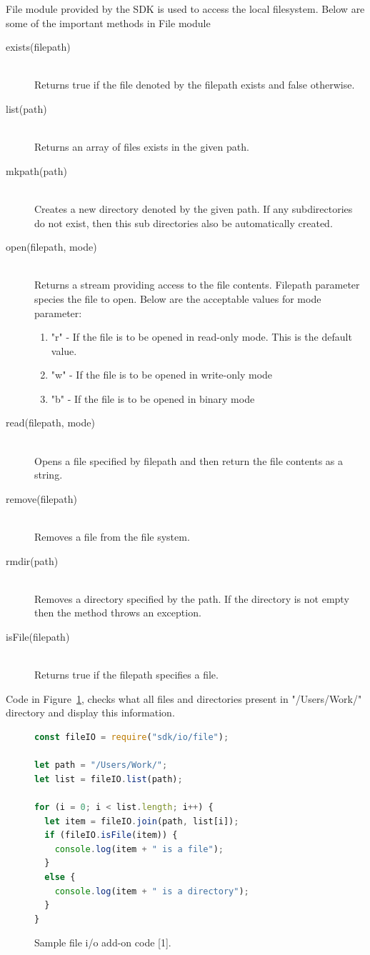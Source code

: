 File module provided by the SDK is used to access the local filesystem. Below are some of the important methods in File module
\begin{description}
\item[exists(filepath)]\hfill \\
Returns true if the file denoted by the filepath exists and false otherwise.
\item[list(path)]\hfill \\
Returns an array of files exists in the given path.
\item[mkpath(path)]\hfill \\
Creates a new directory denoted by the given path. If any subdirectories do not exist, then this sub directories also be automatically created.
\item[open(filepath, mode)]\hfill \\
Returns a stream providing access to the file contents. Filepath parameter species the file to open. Below are the acceptable values for mode parameter:
\begin{enumerate} 
\item "r" - If the file is to be opened in read-only mode. This is the default value. 
\item "w" - If the file is to be opened in write-only mode 
\item "b" - If the file is to be opened in binary mode 
\end{enumerate}
\item[read(filepath, mode)]\hfill \\
Opens a file specified by filepath and then return the file contents as a string.
\item[remove(filepath)]\hfill \\
Removes a file from the file system. 
\item[rmdir(path)]\hfill \\
Removes a directory specified by the path. If the directory is not empty then the method throws an exception.
\item[isFile(filepath)]\hfill \\
Returns true if the filepath specifies a file.
\end{description}


Code in Figure~\ref{fig:fileioaddon}, checks what all files and directories present in "/Users/Work/" directory and display this information.
\begin{figure}[h]
  \centering
\begin{lstlisting}[language=JavaScript]
const fileIO = require("sdk/io/file");

let path = "/Users/Work/";
let list = fileIO.list(path);

for (i = 0; i < list.length; i++) {
  let item = fileIO.join(path, list[i]);
  if (fileIO.isFile(item)) {
    console.log(item + " is a file");
  }
  else {
    console.log(item + " is a directory");
  }
}
\end{lstlisting}
    \caption[Sample file i/o add-on code]{Sample file i/o add-on code [1].}
    \label{fig:fileioaddon}
\end{figure}

